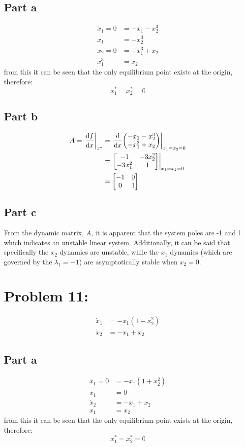 \documentclass[]{article}
\begin{document}
\subsection{Part a}
\begin{align*}
	\dot{x}_1 = 0 &= -x_1 -x_2^3\\
	x_1 &= -x_2^3\\
	\dot{x}_2 = 0 &= -x_1^3 + x_2\\
	x_1^3 &= x_2
\end{align*}
from this it can be seen that the only equilibrium point exists at the origin, therefore:
\begin{displaymath}
	x_1^* = x_2^* = 0
\end{displaymath}

\subsection{Part b}
\begin{align*}
	A = \eval{\dv{f}{x}}_{x^*} &= \eval{\dv{x} \mqty(-x_1 -x_2^3\\ -x_1^3 + x_2)}_{x_1=x_2=0}\\
	&= \eval{\mqty[-1 & -3 x_2^2\\ -3x_1^2& 1]}_{x_1=x_2=0}\\
	&= \mqty[-1&0\\0&1]
\end{align*}

\subsection{Part c}
From the dynamic matrix, $A$, it is apparent that the system poles are -1 and 1 which indicates an unstable linear system. Additionally, it can be said that specifically the $x_2$ dynamics are unstable, while the $x_1$ dynamics (which are governed by the $\lambda_1 = -1$) are asymptotically stable when $x_2 = 0$.

\newpage
\section{Problem 11:}
\begin{align*}
	\dot{x}_1 &= -x_1 (1 + x_2^2)\\
	\dot{x}_2 &= -x_1 + x_2
\end{align*}

\subsection{Part a}
\begin{align*}
	\dot{x}_1 = 0 &= -x_1 (1 + x_2^2)\\
	x_1 &= 0\\
	\dot{x}_2 &= -x_1 + x_2\\
	x_1 &= x_2
\end{align*}
from this it can be seen that the only equilibrium point exists at the origin, therefore:
\begin{displaymath}
	x_1^* = x_2^* = 0
\end{displaymath}
\end{document}
